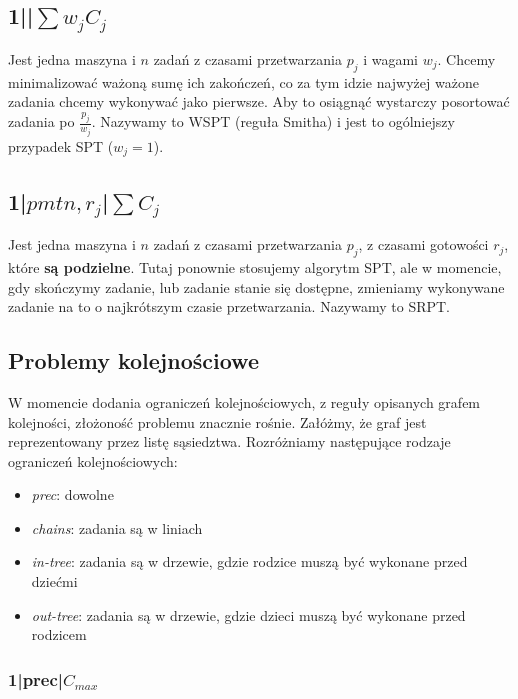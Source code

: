 \documentclass{../notatki}
\begin{document}
\subsection{1||\texorpdfstring{$\sum w_jC_j$}{sum wjCj}}

Jest jedna maszyna i $n$ zadań z czasami przetwarzania $p_j$ i wagami $w_j$.
Chcemy minimalizować ważoną sumę ich zakończeń, co za tym idzie najwyżej ważone
zadania chcemy wykonywać jako pierwsze. Aby to osiągnąć wystarczy posortować
zadania po $\frac{p_j}{w_j}$. Nazywamy to WSPT (reguła Smitha) i jest
to ogólniejszy przypadek SPT ($w_j = 1$).

\subsection{1|\texorpdfstring{$pmtn, r_j$}{pmtn,
rj}|\texorpdfstring{$\sum C_j$}{sum Cj}}

Jest jedna maszyna i $n$ zadań z czasami przetwarzania $p_j$, z
czasami gotowości
$r_j$, które \textbf{są podzielne}. Tutaj ponownie stosujemy algorytm SPT,
ale w momencie, gdy skończymy zadanie, lub zadanie stanie się dostępne,
zmieniamy wykonywane zadanie na to o najkrótszym czasie przetwarzania.
Nazywamy to SRPT.

\subsection{Problemy kolejnościowe}

W momencie dodania ograniczeń kolejnościowych, z reguły opisanych grafem
kolejności, złożoność problemu znacznie rośnie. Załóżmy, że graf
jest reprezentowany przez listę sąsiedztwa. Rozróżniamy następujące
rodzaje ograniczeń kolejnościowych:

\begin{itemize}
  \item \textit{prec}: dowolne
  \item \textit{chains}: zadania są w liniach
  \item \textit{in-tree}: zadania są w drzewie, gdzie rodzice muszą
    być wykonane przed dziećmi
  \item \textit{out-tree}: zadania są w drzewie, gdzie dzieci muszą
    być wykonane przed rodzicem
\end{itemize}

\subsubsection{1|prec|\texorpdfstring{$C_{max}$}{Cmax}}
\end{document}
